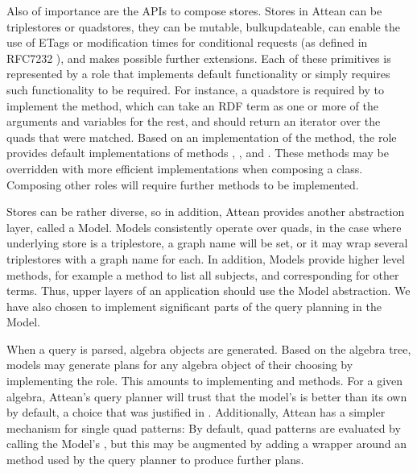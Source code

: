 Also of importance are the APIs to compose stores. Stores in Attean
can be triplestores or quadstores, they can be mutable,
bulkupdateable, can enable the use of ETags or modification times for
conditional requests (as defined in RFC7232 \cite{rfc7234}), and makes
possible further extensions. Each of these primitives is represented
by a role that implements default functionality or simply requires
such functionality to be required. For instance, a quadstore is
required by  to implement the
 method, which can take an RDF term as one or more
of the arguments and variables for the rest, and should return an
iterator over the quads that were matched. Based on an implementation
of the  method, the 
role provides default implementations of methods ,
,  and
. These methods may be overridden with more efficient
implementations when composing a class. Composing other roles will
require further methods to be implemented.

Stores can be rather diverse, so in addition, Attean provides another
abstraction layer, called a Model. Models consistently operate over
quads, in the case where underlying store is a triplestore, a graph
name will be set, or it may wrap several triplestores with a graph
name for each. In addition, Models provide higher level methods,
for example a  method to list all subjects, and
corresponding for other terms. Thus, upper layers of an application
should use the Model abstraction. We have also chosen to implement significant
parts of the query planning in the Model.

When a query is parsed, algebra objects are generated. Based on the
algebra tree, models may generate plans for any algebra object of
their choosing by implementing the 
role. This amounts to implementing  and
 methods. For a given algebra, Attean's query
planner will trust that the model's  is
better than its own by default, a choice that was justified in
\cite{williamspushing}. Additionally, Attean has a simpler mechanism
for single quad patterns: By default, quad patterns are evaluated by
calling the Model's , but this may be augmented by
adding a wrapper around an  method used by the
query planner to produce further plans.

